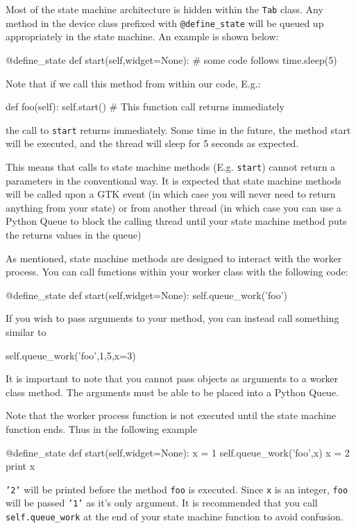 \documentclass[12pt]{article}
\begin{document}
Most of the state machine architecture is hidden within the \texttt{Tab} class. Any method in the device class prefixed with \texttt{@define\_state} will be queued up appropriately in the state machine. An example is shown below:
\begin{python}
    @define_state
    def start(self,widget=None):
        # some code follows
        time.sleep(5)
\end{python}

Note that if we call this method from within our code, E.g.:
\begin{python}
    def foo(self):
        self.start() # This function call returns immediately
\end{python}
the call to \texttt{start} returns immediately. Some time in the future, the method start will be executed, and the thread will sleep for 5 seconds as expected.

This means that calls to state machine methods (E.g. \texttt{start}) cannot return a parameters in the conventional way. It is expected that state machine methods will be called upon a GTK event (in which case you will never need to return anything from your state) or from another thread (in which case you can use a Python Queue to block the calling thread until your state machine method puts the returns values in the queue)

As mentioned, state machine methods are designed to interact with the worker process. You can call functions within your worker class with the following code:
\begin{python}
    @define_state
    def start(self,widget=None):
        self.queue_work('foo')
\end{python}

If you wish to pass arguments to your method, you can instead call something similar to
\begin{python}
        self.queue_work('foo',1,5,x=3)
\end{python}
It is important to note that you cannot pass objects as arguments to a worker class method. The arguments must be able to be placed into a Python Queue.

Note that the worker process function is not executed until the state machine function ends. Thus in the following example 
\begin{python}
    @define_state
    def start(self,widget=None):
        x = 1
        self.queue_work('foo',x)
        x = 2
        print x
\end{python}
\texttt{'2'} will be printed before the method \texttt{foo} is executed. Since \texttt{x} is an integer, \texttt{foo} will be passed \texttt{'1'} as it's only argument. It is recommended that you call \texttt{self.queue\_work} at the end of your state machine function to avoid confusion.
\end{document}
